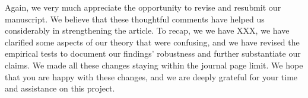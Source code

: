\documentclass[12pt, a4paper, notitlepage]{article}
\begin{document}
\vspace{30pt}

Again, we very much appreciate the opportunity to revise and resubmit our manuscript. We believe that these thoughtful comments have helped us considerably in strengthening the article. To recap, we we have XXX, we have clarified some aspects of our theory that were confusing, and we have revised the empirical tests to document our findings' robustness and further substantiate our claims. We made all these changes staying within the journal page limit. We hope that you are happy with these changes, and we are deeply grateful for your time and assistance on this project.


\newpage


\end{document}
